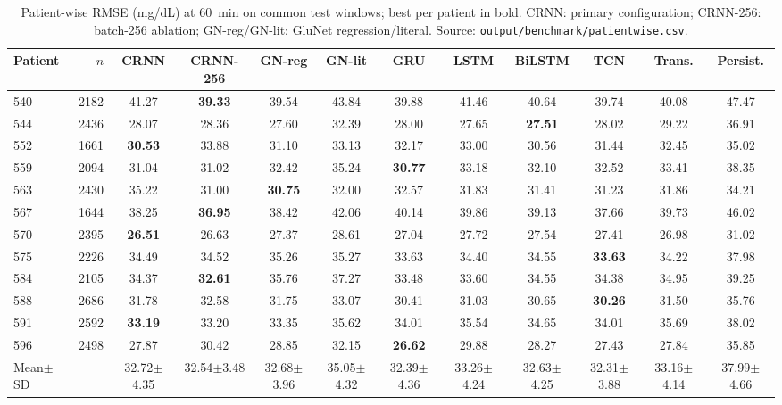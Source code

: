 \begin{table}[t]\centering
\caption{Patient-wise RMSE (mg/dL) at 60~min on common test windows; best per patient in bold. CRNN: primary configuration; CRNN-256: batch-256 ablation; GN-reg/GN-lit: GluNet regression/literal. Source: \texttt{output/benchmark/patientwise.csv}.}
\scriptsize\setlength{\tabcolsep}{3pt}
\begin{tabular}{lrcccccccccc}\toprule
Patient & $n$ & CRNN & CRNN-256 & GN-reg & GN-lit & GRU & LSTM & BiLSTM & TCN & Trans. & Persist.\\\midrule
540 & 2182 & 41.27 & \textbf{39.33} & 39.54 & 43.84 & 39.88 & 41.46 & 40.64 & 39.74 & 40.08 & 47.47\\
544 & 2436 & 28.07 & 28.36 & 27.60 & 32.39 & 28.00 & 27.65 & \textbf{27.51} & 28.02 & 29.22 & 36.91\\
552 & 1661 & \textbf{30.53} & 33.88 & 31.10 & 33.13 & 32.17 & 33.00 & 30.56 & 31.44 & 32.45 & 35.02\\
559 & 2094 & 31.04 & 31.02 & 32.42 & 35.24 & \textbf{30.77} & 33.18 & 32.10 & 32.52 & 33.41 & 38.35\\
563 & 2430 & 35.22 & 31.00 & \textbf{30.75} & 32.00 & 32.57 & 31.83 & 31.41 & 31.23 & 31.86 & 34.21\\
567 & 1644 & 38.25 & \textbf{36.95} & 38.42 & 42.06 & 40.14 & 39.86 & 39.13 & 37.66 & 39.73 & 46.02\\
570 & 2395 & \textbf{26.51} & 26.63 & 27.37 & 28.61 & 27.04 & 27.72 & 27.54 & 27.41 & 26.98 & 31.02\\
575 & 2226 & 34.49 & 34.52 & 35.26 & 35.27 & 33.63 & 34.40 & 34.55 & \textbf{33.63} & 34.22 & 37.98\\
584 & 2105 & 34.37 & \textbf{32.61} & 35.76 & 37.27 & 33.48 & 33.60 & 34.55 & 34.38 & 34.95 & 39.25\\
588 & 2686 & 31.78 & 32.58 & 31.75 & 33.07 & 30.41 & 31.03 & 30.65 & \textbf{30.26} & 31.50 & 35.76\\
591 & 2592 & \textbf{33.19} & 33.20 & 33.35 & 35.62 & 34.01 & 35.54 & 34.65 & 34.01 & 35.69 & 38.02\\
596 & 2498 & 27.87 & 30.42 & 28.85 & 32.15 & \textbf{26.62} & 29.88 & 28.27 & 27.43 & 27.84 & 35.85\\
\midrule
Mean$\pm$SD & & 32.72$\pm$4.35 & 32.54$\pm$3.48 & 32.68$\pm$3.96 & 35.05$\pm$4.32 & 32.39$\pm$4.36 & 33.26$\pm$4.24 & 32.63$\pm$4.25 & 32.31$\pm$3.88 & 33.16$\pm$4.14 & 37.99$\pm$4.66\\
\bottomrule
\end{tabular}\end{table}
